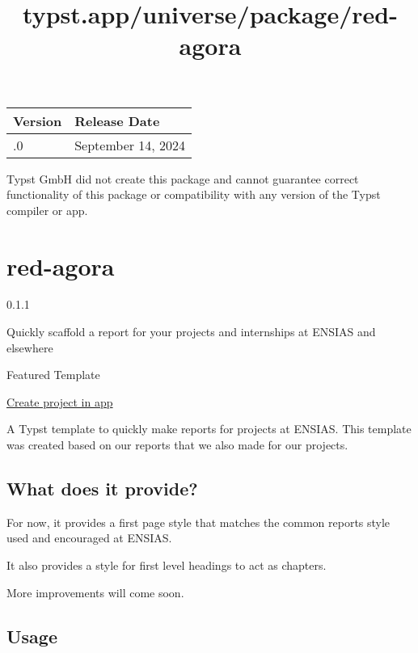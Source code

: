 \begin{longtable}[]{@{}ll@{}}
\toprule\noalign{}
Version & Release Date \\
\midrule\noalign{}
\endhead
\bottomrule\noalign{}
\endlastfoot
0.1.0 & September 14, 2024 \\
\end{longtable}

Typst GmbH did not create this package and cannot guarantee correct
functionality of this package or compatibility with any version of the
Typst compiler or app.


\title{typst.app/universe/package/red-agora}

\label{banner}
\label{template-thumbnail}

\section{red-agora}\label{red-agora}

{ 0.1.1 }

Quickly scaffold a report for your projects and internships at ENSIAS
and elsewhere

{ } Featured Template

\href{/app?template=red-agora&version=0.1.1}{Create project in app}

\label{readme}
A Typst template to quickly make reports for projects at ENSIAS. This
template was created based on our reports that we also made for our
projects.

\subsection{What does it provide?}\label{what-does-it-provide}

For now, it provides a first page style that matches the common reports
style used and encouraged at ENSIAS.

It also provides a style for first level headings to act as chapters.

More improvements will come soon.

\subsection{Usage}\label{usage}

